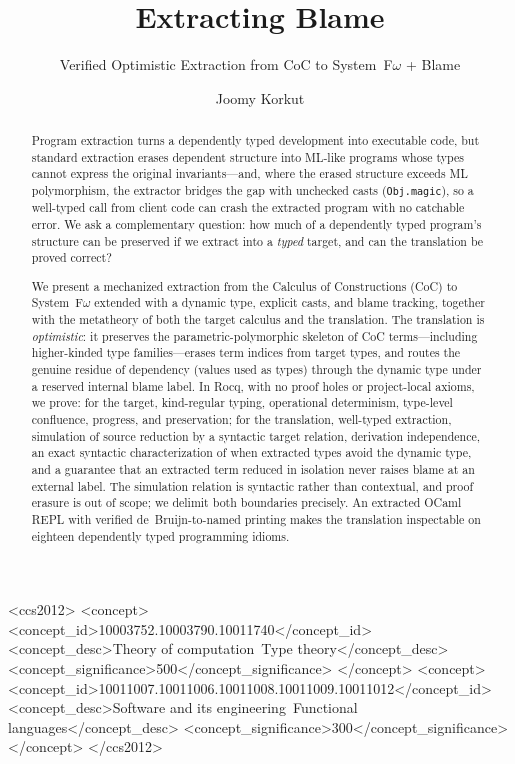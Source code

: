 \documentclass[acmsmall,anonymous=false,nonacm]{acmart}
\begin{document}
\title{Extracting Blame}
\subtitle{Verified Optimistic Extraction from CoC to System~F$\omega$ + Blame}

\author{Joomy Korkut}

\renewcommand{\shortauthors}{Korkut}

\begin{abstract}
Program extraction turns a dependently typed development into executable code,
but standard extraction erases dependent structure into ML-like programs whose
types cannot express the original invariants---and, where the erased structure
exceeds ML polymorphism, the extractor bridges the gap with unchecked casts
(\texttt{Obj.magic}), so a well-typed call from client code can crash the
extracted program with no catchable error. We ask a complementary question:
how much of a dependently typed program's structure can be preserved if we
extract into a \emph{typed} target, and can the translation be proved correct?

We present a mechanized extraction from the Calculus of Constructions (CoC) to
System~F$\omega$ extended with a dynamic type, explicit casts, and blame
tracking, together with the metatheory of both the target calculus and the
translation. The translation is \emph{optimistic}: it preserves the
parametric-polymorphic skeleton of CoC terms---including higher-kinded type
families---erases term indices from target types, and routes the genuine
residue of dependency (values used as types) through the dynamic type under a
reserved internal blame label. In Rocq, with no proof holes or project-local
axioms, we prove: for the target, kind-regular typing, operational
determinism, type-level confluence, progress, and preservation; for the
translation, well-typed extraction, simulation of source reduction by a
syntactic target relation, derivation independence, an exact syntactic
characterization of when extracted types avoid the dynamic type, and a
guarantee that an extracted term reduced in isolation never raises blame at an
external label. The simulation relation is syntactic rather than contextual,
and proof erasure is out of scope; we delimit both boundaries precisely. An
extracted OCaml REPL with verified de~Bruijn-to-named printing makes the
translation inspectable on eighteen dependently typed programming idioms.
\end{abstract}

\begin{CCSXML}
<ccs2012>
<concept>
<concept_id>10003752.10003790.10011740</concept_id>
<concept_desc>Theory of computation~Type theory</concept_desc>
<concept_significance>500</concept_significance>
</concept>
<concept>
<concept_id>10011007.10011006.10011008.10011009.10011012</concept_id>
<concept_desc>Software and its engineering~Functional languages</concept_desc>
<concept_significance>300</concept_significance>
</concept>
</ccs2012>
\end{CCSXML}
\end{document}
